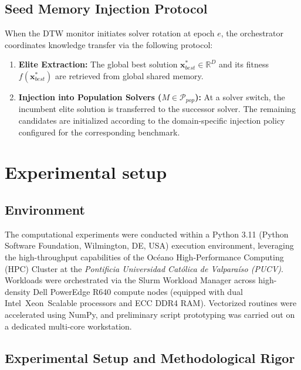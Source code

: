 \documentclass[review]{elsarticle}
\begin{document}
\subsection{Seed Memory Injection Protocol}

When the DTW monitor initiates solver rotation at epoch $e$, the orchestrator coordinates knowledge transfer via the following protocol:
\begin{enumerate}
    \item \textbf{Elite Extraction:} The global best solution $\mathbf{x}_{best}^* \in \mathbb{R}^D$ and its fitness $f(\mathbf{x}_{best}^*)$ are retrieved from global shared memory.
    \item \textbf{Injection into Population Solvers ($M \in \mathcal{P}_{pop}$):} At a solver switch, the incumbent elite solution is transferred to the successor solver. The remaining candidates are initialized according to the domain-specific injection policy configured for the corresponding benchmark.
\end{enumerate}


\section{Experimental setup}


\subsection{Environment}
\label{sec:computational_environment}

The computational experiments were conducted within a Python 3.11 (Python Software Foundation, Wilmington, DE, USA) execution environment, leveraging the high-throughput capabilities of the Océano High-Performance Computing (HPC) Cluster at the \textit{Pontificia Universidad Católica de Valparaíso (PUCV)}. Workloads were orchestrated via the Slurm Workload Manager across high-density Dell PowerEdge R640 compute nodes (equipped with dual Intel\textregistered\ Xeon\textregistered\ Scalable processors and ECC DDR4 RAM). Vectorized routines were accelerated using NumPy, and preliminary script prototyping was carried out on a dedicated multi-core workstation.
\subsection{Experimental Setup and Methodological Rigor}
\label{sec:experimental_setup}
\end{document}
